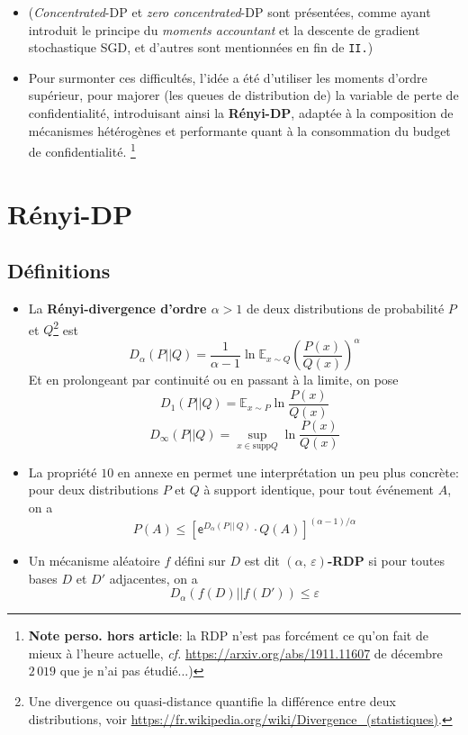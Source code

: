 \documentclass[a4paper,11pt]{article} %
\newcommand{\evid}[1]{\colorbox{blue!10}{\textbf{#1}}}
\begin{document}
\begin{itemize}
    \item 
    (\emph{Concentrated}-DP et \emph{zero concentrated}-DP sont présentées, comme ayant introduit le principe du \emph{moments accountant} et la descente de gradient stochastique SGD, et d'autres sont mentionnées en fin de \texttt{II.})
    \item 
    Pour surmonter ces difficultés, l'idée a été d'utiliser les \og moments d'ordre supérieur\fg{}, pour majorer (les queues de distribution de) la variable de perte de confidentialité, introduisant ainsi la \evid{Rényi-DP}, adaptée à la composition de mécanismes hétérogènes et performante quant à la consommation du budget de confidentialité.    \footnote{\textbf{Note perso. hors article}: la RDP n'est pas forcément ce qu'on fait de mieux à l'heure actuelle, \emph{cf.} \url{https://arxiv.org/abs/1911.11607} de décembre $2\,019$ que je n'ai pas étudié...)}
\end{itemize}
\section{Rényi-DP}
\subsection{Définitions}
%
\begin{itemize}
    \item 
    La \evid{Rényi-divergence d'ordre $\alpha > 1$} de deux distributions de probabilité $P$ et $Q$\footnote{Une divergence ou \og quasi-distance\fg{} quantifie la différence entre deux distributions, voir \url{https://fr.wikipedia.org/wiki/Divergence_(statistiques)}.} est 
    \[ D_\alpha(P||Q) = \frac{1}{\alpha - 1} \ln \mathbb{E}_{x\sim Q}\left( \frac{P(x)}{Q(x)} \right)^\alpha \]
    Et en prolongeant par continuité ou en passant à la limite, on pose
    \[ D_1(P||Q) = \mathbb{E}_{x\sim P} \ln \frac{P(x)}{Q(x)} \]
    \[ D_\infty(P||Q) = \sup_{x\in \text{supp}Q} \ln \frac{P(x)}{Q(x)} \]
   \item 
    La propriété $10$ en annexe en permet une interprétation un peu plus concrète: pour deux distributions $P$ et $Q$ à support identique, pour tout événement $A$, on a
    \[ P(A) \leqslant \left[ \mathsf{e}^{D_\alpha(P\,||\, Q)} \cdot Q(A) \right]^{(\alpha-1)/\alpha} \]
    \item 
   Un mécanisme aléatoire $f$ défini sur $D$ est dit \evid{$(\alpha,\,\varepsilon)$-RDP} si pour toutes bases $D$ et $D'$ adjacentes, on a
   \[ D_\alpha(f(D)||f(D')) \leqslant \varepsilon \]
\end{itemize}
%
\end{document}
